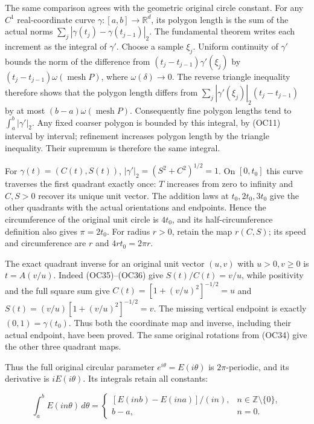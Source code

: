\documentclass[
  11pt,
]{article}
\begin{document}
The same comparison agrees with the geometric original circle constant.
For any \(C^1\) real-coordinate curve \(\gamma:[a,b]\to\mathbb R^d\),
its polygon length is the sum of the actual norms
\(\sum_j|\gamma(t_j)-\gamma(t_{j-1})|_2\). The fundamental theorem
writes each increment as the integral of \(\gamma'\). Choose a sample
\(\xi_j\). Uniform continuity of \(\gamma'\) bounds the norm of the
difference from \((t_j-t_{j-1})\gamma'(\xi_j)\) by
\((t_j-t_{j-1})\omega(\operatorname{mesh}P)\), where
\(\omega(\delta)\to0\). The reverse triangle inequality therefore shows
that the polygon length differs from
\(\sum_j|\gamma'(\xi_j)|_2(t_j-t_{j-1})\) by at most
\((b-a)\omega(\operatorname{mesh}P)\). Consequently fine polygon lengths
tend to \(\int_a^b|\gamma'|_2\). Any fixed coarser polygon is bounded by
this integral, by (OC11) interval by interval; refinement increases
polygon length by the triangle inequality. Their supremum is therefore
the same integral.

For \(\gamma(t)=(C(t),S(t))\), \(|\gamma'|_2=(S^2+C^2)^{1/2}=1\). On
\([0,t_0]\) this curve traverses the first quadrant exactly once: \(T\)
increases from zero to infinity and \(C,S>0\) recover its unique unit
vector. The addition laws at \(t_0,2t_0,3t_0\) give the other quadrants
with the actual orientations and endpoints. Hence the circumference of
the original unit circle is \(4t_0\), and its half-circumference
definition also gives \(\pi=2t_0\). For radius \(r>0\), retain the map
\(r(C,S)\); its speed and circumference are \(r\) and \(4rt_0=2\pi r\).

The exact quadrant inverse for an original unit vector \((u,v)\) with
\(u>0,v\ge0\) is \(t=A(v/u)\). Indeed (OC35)--(OC36) give
\(S(t)/C(t)=v/u\), while positivity and the full square sum give
\(C(t)=[1+(v/u)^2]^{-1/2}=u\) and \(S(t)=(v/u)[1+(v/u)^2]^{-1/2}=v\).
The missing vertical endpoint is exactly \((0,1)=\gamma(t_0)\). Thus
both the coordinate map and inverse, including their actual endpoint,
have been proved. The same original rotations from (OC34) give the other
three quadrant maps.

Thus the full original circular parameter \(e^{i\theta}=E(i\theta)\) is
\(2\pi\)-periodic, and its derivative is \(iE(i\theta)\). Its integrals
retain all constants:

\[
 \int_a^b E(i n\theta)\,d\theta
 =\begin{cases}
   [E(i n b)-E(i n a)]/(i n),&n\in\mathbb Z\setminus\{0\},\\
   b-a,&n=0.
 \end{cases}
\tag{OC37}
\]
\end{document}
